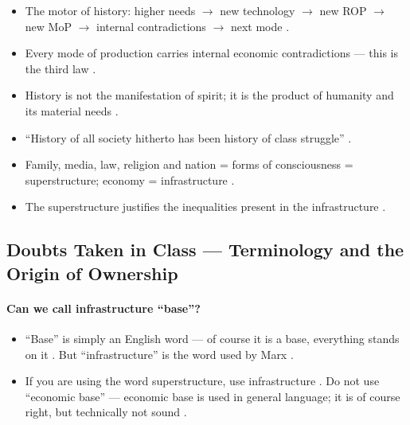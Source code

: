 \begin{QuickRevision}
\begin{itemize}
    \item The motor of history: higher needs $\rightarrow$ new technology $\rightarrow$ new ROP $\rightarrow$ new MoP $\rightarrow$ internal contradictions $\rightarrow$ next mode .
    \item Every mode of production carries internal economic contradictions --- this is the third law .
    \item History is not the manifestation of spirit; it is the product of humanity and its material needs .
    \item ``History of all society hitherto has been history of class struggle'' .
    \item Family, media, law, religion and nation = forms of consciousness = superstructure; economy = infrastructure .
    \item The superstructure justifies the inequalities present in the infrastructure .
\end{itemize}
\end{QuickRevision}

\subsection{Doubts Taken in Class --- Terminology and the Origin of Ownership}

\paragraph{Can we call infrastructure ``base''?}
\begin{itemize}
    \item ``Base'' is simply an English word --- of course it is a base, everything stands on it . But ``infrastructure'' is the word used by Marx .
    \item If you are using the word superstructure, use infrastructure . Do not use ``economic base'' --- economic base is used in general language; it is of course right, but technically not sound .
\end{itemize}

